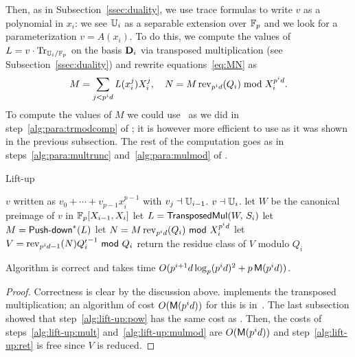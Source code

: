 Then, as in Subsection~\ref{ssec:duality}, we use trace formulas to
write $v$ as a polynomial in $x_i$: we see $\mathbb{U}_i$ as a separable
extension over $\mathbb{F}_p$ and we look for a parameterization
$v=A(x_i)$. To do this, we compute the values of
$L=v\cdot\operatorname{Tr}_{\mathbb{U}_i/\mathbb{F}_p}$ on the basis $\mathbf{D}_i$ via transposed
multiplication (see Subsection~\ref{ssec:duality}) and rewrite
equations~\eqref{eq:MN} as
\begin{equation}
  \label{eq:MNliftup}
  M = \sum_{j < p^id}L(x_i^j)X_i^j,\quad N = M\operatorname{rev}_{p^id}(Q_i) \bmod X_i^{p^id}.
\end{equation}
To compute the values of $M$ we could use~\cite[Th.~4]{Sho94} as we
did in step~\ref{alg:para:trmodcomp} of ; it
is however more efficient to use  as it was
shown in the previous subsection. The rest of the computation goes as
in steps~\ref{alg:para:multrunc} and~\ref{alg:para:mulmod} of
.

\begin{algorithm}
  \caption{Lift-up}
  \begin{algorithmic}[1]
    \REQUIRE $v$ written as $v_0+\cdots+v_{p-1}x_i^{p-1}$ with $v_j \dashv \mathbb{U}_{i-1}$.
    \ENSURE $v\dashv \mathbb{U}_i$.
    \STATE let $W$ be the canonical preimage of $v$ in $\mathbb{F}_p[X_{i-1},X_i]$
    \STATE \label{alg:lift-up:transmul} let $L = {\sf TransposedMul}(W,\,S_i)$
    \STATE \label{alg:lift-up:pow} let $M={\text{\sf Push-down}}^\ast(L)$
    \STATE \label{alg:lift-up:mult} let $N = M \operatorname{rev}_{p^id}(Q_i) {\sf ~mod~} X_i^{p^id}$
    \STATE \label{alg:lift-up:mulmod} let $V=\operatorname{rev}_{p^id-1}(N) {Q_i'}^{-1} {\sf ~mod~} Q_i$
    \STATE \label{alg:lift-up:ret} return the residue class of $V$ modulo $Q_i$
  \end{algorithmic}
\end{algorithm}

\begin{proposition}\label{prop:lu}
 Algorithm  is correct and takes time $O(p^{i+1}d\log_p(p^id)^2+p\,\mathrm{\sf M}(p^{i}d))$.
\end{proposition}
\begin{proof} Correctness is clear by the discussion
above.  implements the transposed multiplication;
an algorithm of cost $O(\mathrm{\sf M}(p^id))$ for this is
in~\cite[Coro.~2]{PS06}.  The last subsection showed that
step~\ref{alg:lift-up:pow} has the same cost as . Then,
the costs of steps~\ref{alg:lift-up:mult} and~\ref{alg:lift-up:mulmod}
are $O(\mathrm{\sf M}(p^id))$ and step~\ref{alg:lift-up:ret} is free since $V$
is reduced.\end{proof}


